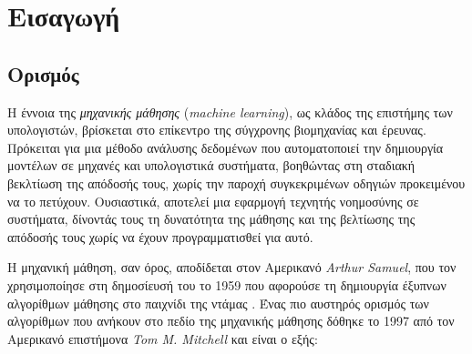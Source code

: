 
\newenvironment{conditions}
  {\par\vspace{\abovedisplayskip}\noindent\begin{tabular}{>{$}l<{$} @{${}={}$} l}}
  {\end{tabular}\par\vspace{\belowdisplayskip}}


\newcommand{\addsymbol}{\draw[thick] (0.5em,0.5em) -- (0,0.5em) -- 
                        (0,-0.5em) --  (-0.5em,-0.5em)
                        (0em,0.75em) -- (0em,-0.75em)
                        (0.75em,0em) -- (-0.75em,0em);}



\section{Εισαγωγή}

\subsection{Ορισμός}

Η έννοια της \textit{μηχανικής μάθησης} (\textit{machine learning}), ως κλάδος της επιστήμης των υπολογιστών, βρίσκεται στο επίκεντρο της σύγχρονης βιομηχανίας και έρευνας. Πρόκειται για μια μέθοδο ανάλυσης δεδομένων που αυτοματοποιεί την δημιουργία μοντέλων σε μηχανές και υπολογιστικά συστήματα, βοηθώντας στη σταδιακή βεκλτίωση της απόδοσής τους, χωρίς την παροχή συγκεκριμένων οδηγιών προκειμένου να το πετύχουν. Ουσιαστικά, αποτελεί μια εφαρμογή τεχνητής νοημοσύνης σε συστήματα, δίνοντάς τους τη δυνατότητα της μάθησης και της βελτίωσης της απόδοσής τους χωρίς να έχουν προγραμματισθεί για αυτό.

\medskip
Η μηχανική μάθηση, σαν όρος, αποδίδεται στον Αμερικανό \textit{Arthur Samuel}, που τον χρησιμοποίησε στη δημοσίευσή του το 1959 που αφορούσε τη δημιουργία έξυπνων αλγορίθμων μάθησης στο παιχνίδι της ντάμας \cite{Samuel1959}. Ένας πιο αυστηρός ορισμός των αλγορίθμων που ανήκουν στο πεδίο της μηχανικής μάθησης δόθηκε το 1997 από τον Αμερικανό επιστήμονα \textit{Tom M. Mitchell} και είναι ο εξής:


